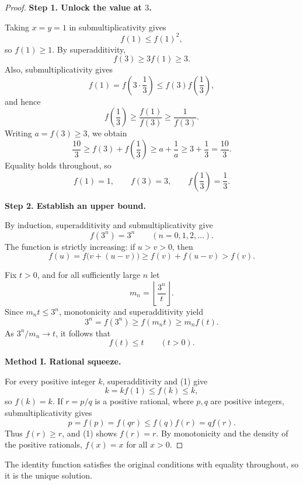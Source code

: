 
\begin{dlsummary}[title={\bfseries Solution 5. The Triadic Balance},breakable]

\begin{proof}
\textbf{Step 1. Unlock the value at $3$.}

Taking $x=y=1$ in submultiplicativity gives
\[
f(1)\le f(1)^2,
\]
so $f(1)\ge1$. By superadditivity,
\[
f(3)\ge3f(1)\ge3.
\]
Also, submultiplicativity gives
\[
f(1)=f\left(3\cdot\frac13\right)
\le f(3)f\left(\frac13\right),
\]
and hence
\[
f\left(\frac13\right)\ge\frac{f(1)}{f(3)}\ge\frac1{f(3)}.
\]
Writing $a=f(3)\ge3$, we obtain
\[
\frac{10}{3}
\ge f(3)+f\left(\frac13\right)
\ge a+\frac1a
\ge 3+\frac13=\frac{10}{3}.
\]
Equality holds throughout, so
\[
f(1)=1,\qquad f(3)=3,\qquad f\left(\frac13\right)=\frac13.
\]

\medskip
\noindent\textbf{Step 2. Establish an upper bound.}

By induction, superadditivity and submultiplicativity give
\[
f(3^n)=3^n\qquad(n=0,1,2,\ldots).
\]
The function is strictly increasing: if $u>v>0$, then
\[
f(u)=f\bigl(v+(u-v)\bigr)
\ge f(v)+f(u-v)>f(v).
\]

Fix $t>0$, and for all sufficiently large $n$ let
\[
m_n=\left\lfloor\frac{3^n}{t}\right\rfloor.
\]
Since $m_nt\le3^n$, monotonicity and superadditivity yield
\[
3^n=f(3^n)\ge f(m_nt)\ge m_nf(t).
\]
As $3^n/m_n\to t$, it follows that
\[
f(t)\le t\qquad(t>0). \tag{1}
\]

\medskip
\noindent\textbf{Method I. Rational squeeze.}

For every positive integer $k$, superadditivity and (1) give
\[
k=kf(1)\le f(k)\le k,
\]
so $f(k)=k$. If $r=p/q$ is a positive rational, where $p,q$ are
positive integers, submultiplicativity gives
\[
p=f(p)=f(qr)\le f(q)f(r)=qf(r).
\]
Thus $f(r)\ge r$, and (1) shows $f(r)=r$. By monotonicity and the
density of the positive rationals, $f(x)=x$ for all $x>0$.

\end{proof}

The identity function satisfies the original conditions with equality
throughout, so it is the unique solution.

\end{dlsummary}